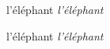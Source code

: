 \documentclass{article}
\begin{document}
l'éléphant \textit{l'éléphant}

\newpage
l'éléphant \textit{l'éléphant }
\end{document}
